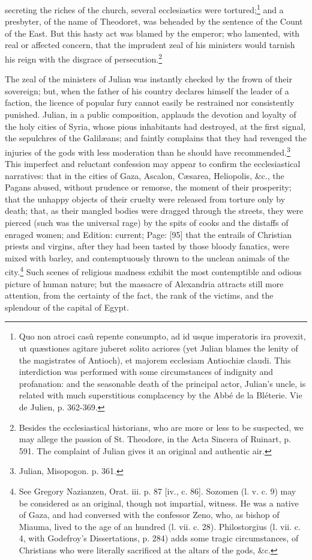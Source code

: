 secreting the riches of the church, several ecclesiastics were tortured;\footnote{Quo non atroci casû repente consumpto, ad id usque imperatoris ira provexit, ut quæstiones agitare juberet solito acriores (yet Julian blames the lenity of the magistrates of Antioch), et majorem ecclesiam Antiochiæ claudi. This interdiction was performed with some circumstances of indignity and profanation: and the seasonable death of the principal actor, Julian\texthebrew{}’s uncle, is related with much superstitious complacency by the Abbé de la Bléterie. Vie de Julien, p. 362-369.} and a presbyter, of the name of Theodoret, was beheaded by the sentence of the Count of the East. But this hasty act was blamed by the emperor; who lamented, with real or affected concern, that the imprudent zeal of his ministers would tarnish his reign with the disgrace of persecution.\footnote{Besides the ecclesiastical historians, who are more or less to be suspected, we may allege the passion of St. Theodore, in the Acta Sincera of Ruinart, p. 591. The complaint of Julian gives it an original and authentic air.}

The zeal of the ministers of Julian was instantly checked by the frown of their sovereign; but, when the father of his country declares himself the leader of a faction, the licence of popular fury cannot easily be restrained nor consistently punished. Julian, in a public composition, applauds the devotion and loyalty of the holy cities of Syria, whose pious inhabitants had destroyed, at the first signal, the sepulchres of the Galilæans; and faintly complains that they had revenged the injuries of the gods with less moderation than he should have recommended.\footnote{Julian, Misopogon. p. 361.} This imperfect and reluctant confession may appear to confirm the ecclesiastical narratives: that in the cities of Gaza, Ascalon, Cæsarea, Heliopolis, \&c., the Pagans abused, without prudence or remorse, the moment of their prosperity; that the unhappy objects of their cruelty were released from torture only by death; that, as their mangled bodies were dragged through the streets, they were pierced (such was the universal rage) by the spits of cooks and the distaffs of enraged women; and Edition: current; Page: [95] that the entrails of Christian priests and virgins, after they had been tasted by those bloody fanatics, were mixed with barley, and contemptuously thrown to the unclean animals of the city.\footnote{See Gregory Nazianzen, Orat. iii. p. 87 [iv., c. 86]. Sozomen (l. v. c. 9) may be considered as an original, though not impartial, witness. He was a native of Gaza, and had conversed with the confessor Zeno, who, as bishop of Miauma, lived to the age of an hundred (l. vii. c. 28). Philostorgius (l. vii. c. 4, with Godefroy\texthebrew{}’s Dissertations, p. 284) adds some tragic circumstances, of Christians who were literally sacrificed at the altars of the gods, \&c.} Such scenes of religious madness exhibit the most contemptible and odious picture of human nature; but the massacre of Alexandria attracts still more attention, from the certainty of the fact, the rank of the victims, and the splendour of the capital of Egypt.

